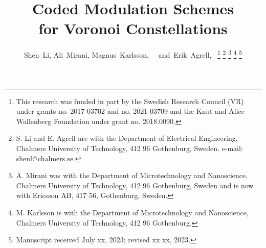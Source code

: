 \documentclass[journal]{IEEEtran}
\begin{document}
%
\title{Coded Modulation Schemes\\ for Voronoi Constellations}

%
%

\author{Shen~Li,
        Ali~Mirani,
        Magnus~Karlsson,~~
        and~Erik~Agrell,~%
\thanks{This research was funded in part by the Swedish Research Council (VR) under grants no. 2017-03702 and no. 2021-03709 and the Knut and Alice Wallenberg Foundation under grant no. 2018.0090.}
\thanks{S. Li and E. Agrell are with the Department
of Electrical Engineering, Chalmers University of Technology, 412 96 Gothenburg, Sweden. e-mail: shenl@chalmers.se.}%
\thanks{A. Mirani was with the Department
of Microtechnology and Nanoscience, Chalmers University of Technology, 412 96 Gothenburg, Sweden and is now with Ericsson AB, 417 56, Gothenburg, Sweden.}
\thanks{M. Karlsson is with the Department
of Microtechnology and Nanoscience, Chalmers University of Technology, 412 96 Gothenburg.}%
\thanks{Manuscript received July xx, 2023; revised xx xx, 2023.}
}
\end{document}
